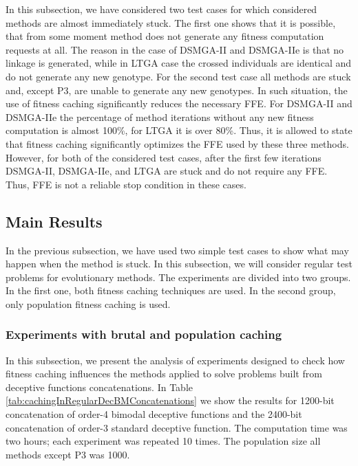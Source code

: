 In this subsection, we have considered two test cases for which considered methods are almost immediately stuck. The first one shows that it is possible, that from some moment method does not generate any fitness computation requests at all. The reason in the case of DSMGA-II and DSMGA-IIe is that no linkage is generated, while in LTGA case the crossed individuals are identical and do not generate any new genotype. For the second test case all methods are stuck and, except P3, are unable to generate any new genotypes. In such situation, the use of fitness caching significantly reduces the necessary FFE. For DSMGA-II and DSMGA-IIe the percentage of method iterations without any new fitness computation is almost 100\%, for LTGA it is over 80\%. Thus, it is allowed to state that fitness caching significantly optimizes the FFE used by these three methods. However, for both of the considered test cases, after the first few iterations DSMGA-II, DSMGA-IIe, and LTGA are stuck and do not require any FFE. Thus, FFE is not a reliable stop condition in these cases.

\subsection{Main Results}
\label{sec:MainResults}

In the previous subsection, we have used two simple test cases to show what may happen when the method is stuck. In this subsection, we will consider regular test problems for evolutionary methods. The experiments are divided into two groups. In the first one, both fitness caching techniques are used. In the second group, only population fitness caching is used.

\subsubsection{Experiments with brutal and population caching}

In this subsection, we present the analysis of experiments designed to check how fitness caching influences the methods applied to solve problems built from deceptive functions concatenations. In Table \ref{tab:cachingInRegularDecBMConcatenations} we show the results for 1200-bit concatenation of order-4 bimodal deceptive functions and the 2400-bit concatenation of order-3 standard deceptive function. The computation time was two hours; each experiment was repeated 10 times. The population size all methods except P3 was 1000.

